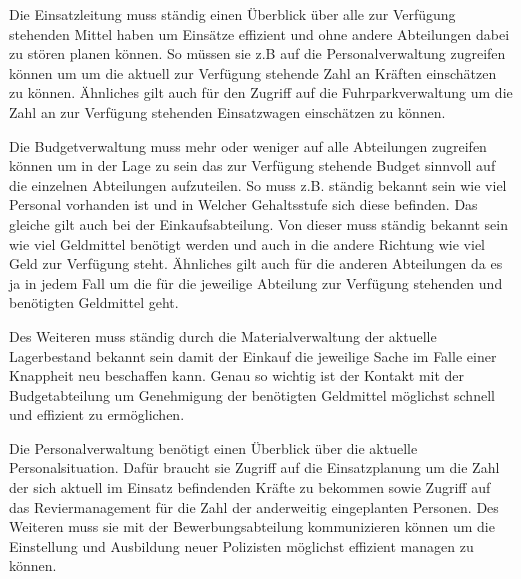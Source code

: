 \documentclass[12pt,utf8]{scrartcl}
\begin{document}
Die Einsatzleitung muss ständig einen Überblick über alle zur Verfügung stehenden Mittel haben um Einsätze effizient und ohne andere Abteilungen dabei zu stören planen können. So müssen sie z.B auf die Personalverwaltung zugreifen können um um die aktuell zur Verfügung stehende Zahl an Kräften einschätzen zu können. Ähnliches gilt auch für den Zugriff auf die Fuhrparkverwaltung um die Zahl an zur Verfügung stehenden Einsatzwagen einschätzen zu können.

Die Budgetverwaltung muss mehr oder weniger auf alle Abteilungen zugreifen können um in der Lage zu sein das zur Verfügung stehende Budget sinnvoll auf die einzelnen Abteilungen aufzuteilen. So muss z.B. ständig bekannt sein wie viel Personal vorhanden ist und in Welcher Gehaltsstufe sich diese befinden. Das gleiche gilt auch bei der Einkaufsabteilung. Von dieser muss ständig bekannt sein wie viel Geldmittel benötigt werden und auch in die andere Richtung wie viel Geld zur Verfügung steht. Ähnliches gilt auch für die anderen Abteilungen da es ja in jedem Fall um die für die jeweilige Abteilung zur Verfügung stehenden und benötigten Geldmittel geht.

Des Weiteren muss ständig durch die Materialverwaltung der aktuelle Lagerbestand bekannt sein damit der Einkauf die jeweilige Sache im Falle einer Knappheit neu beschaffen kann. Genau so wichtig ist der Kontakt mit der Budgetabteilung um Genehmigung der benötigten Geldmittel möglichst schnell und effizient zu ermöglichen.

Die Personalverwaltung benötigt einen Überblick über die aktuelle Personalsituation. Dafür braucht sie Zugriff auf die Einsatzplanung um die Zahl der sich aktuell im Einsatz befindenden Kräfte zu bekommen sowie Zugriff auf das Reviermanagement für die Zahl der anderweitig eingeplanten Personen. Des Weiteren muss sie mit der Bewerbungsabteilung kommunizieren können um die Einstellung und Ausbildung neuer Polizisten möglichst effizient managen zu können.
\end{document}
